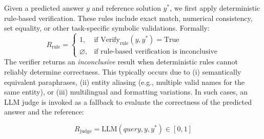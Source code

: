\documentclass{huawei}
\begin{document}

Given a predicted answer $y$ and reference solution $y^{*}$, we first apply deterministic rule-based verification. These rules include exact match, numerical consistency, set equality, or other task-specific symbolic validations. Formally:
\begin{equation}
R_{\text{rule}} =
\begin{cases}
1, & \text{if } \text{Verify}_{\text{rule}}(y, y^{*}) = \text{True} \\
\varnothing, & \text{if rule-based verification is inconclusive}
\end{cases}
\end{equation}
The verifier returns an \emph{inconclusive} result when deterministic rules cannot reliably determine correctness. This typically occurs due to (i) semantically equivalent paraphrases, (ii) entity aliasing (e.g., multiple valid names for the same entity), or (iii) multilingual and formatting variations.
In such cases, an LLM judge is invoked as a fallback to evaluate the correctness of the predicted answer and the reference:


\begin{equation}
R_{\text{judge}} = \text{LLM}(query, y, y^{*}) \in [0, 1]
\end{equation}


\end{document}
